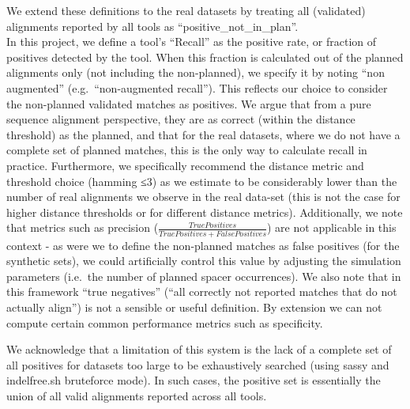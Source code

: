 \documentclass[
]{article}
\begin{document}
We extend these definitions to the real datasets by treating all
(validated) alignments reported by all tools as
``positive\_not\_in\_plan''.\\
In this project, we define a tool's ``Recall'' as the positive rate, or
fraction of positives detected by the tool. When this fraction is
calculated out of the planned alignments only (not including the
non-planned), we specify it by noting ``non augmented''
(e.g.~``non-augmented recall''). This reflects our choice to consider
the non-planned validated matches as positives. We argue that from a
pure sequence alignment perspective, they are as correct (within the
distance threshold) as the planned, and that for the real datasets,
where we do not have a complete set of planned matches, this is the only
way to calculate recall in practice. Furthermore, we specifically
recommend the distance metric and threshold choice (hamming ≤3) as we
estimate to be considerably lower than the number of real alignments we
observe in the real data-set (this is not the case for higher distance
thresholds or for different distance metrics). Additionally, we note
that metrics such as precision
(\(\frac{TruePositives}{TruePositives + FalsePositives}\)) are not
applicable in this context - as were we to define the non-planned
matches as false positives (for the synthetic sets), we could
artificially control this value by adjusting the simulation parameters
(i.e.~the number of planned spacer occurrences). We also note that in
this framework ``true negatives'' (``all correctly not reported matches
that do not actually align'') is not a sensible or useful definition. By
extension we can not compute certain common performance metrics such as
specificity.

We acknowledge that a limitation of this system is the lack of a
complete set of all positives for datasets too large to be exhaustively
searched (using sassy and indelfree.sh bruteforce mode). In such cases,
the positive set is essentially the union of all valid alignments
reported across all tools.
\end{document}
